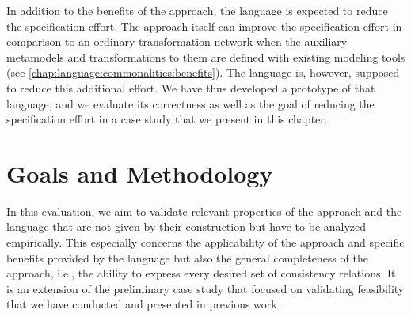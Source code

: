 In addition to the benefits of the \commonalities approach, the \commonalities language is expected to reduce the specification effort.
The \commonalities approach itself can improve the specification effort in comparison to an ordinary transformation network when the auxiliary metamodels and transformations to them are defined with existing modeling tools (see \autoref{chap:language:commonalities:benefits}).
The \commonalities language is, however, supposed to reduce this additional effort.
We have thus developed a prototype of that language, and we evaluate its correctness as well as the goal of reducing the specification effort in a case study that we present in this chapter.


\section{Goals and Methodology}

In this evaluation, we aim to validate relevant properties of the \commonalities approach and the \commonalities language that are not given by their construction but have to be analyzed empirically.
This especially concerns the applicability of the approach and specific benefits provided by the language but also the general completeness of the approach, i.e., the ability to express every desired set of consistency relations.
It is an extension of the preliminary case study that focused on validating feasibility that we have conducted and presented in previous work~.

